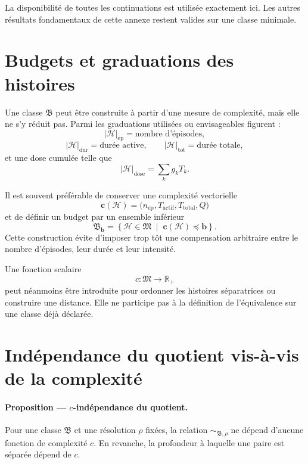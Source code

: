 La disponibilité de toutes les continuations est utilisée exactement
ici. Les autres résultats fondamentaux de cette annexe restent valides
sur une classe minimale.

\section{Budgets et graduations des histoires}
\label{annexe-histoires-budgets}

Une classe \(\mathfrak B\) peut être construite à partir d'une mesure de
complexité, mais elle ne s'y réduit pas. Parmi les graduations utilisées
ou envisageables figurent :
\[
|\mathcal H|_{\mathrm{ep}}
=
\text{nombre d'épisodes},
\]
\[
|\mathcal H|_{\mathrm{dur}}
=
\text{durée active},
\qquad
|\mathcal H|_{\mathrm{tot}}
=
\text{durée totale},
\]
et une dose cumulée telle que
\[
|\mathcal H|_{\mathrm{dose}}
=
\sum_k g_kT_k.
\]

Il est souvent préférable de conserver une complexité vectorielle
\begin{equation}
\label{eq:annexe-G-complexite-vectorielle}
\mathbf c(\mathcal H)
=
\bigl(
 n_{\mathrm{ep}},
 T_{\mathrm{actif}},
 T_{\mathrm{total}},
 Q
\bigr)
\end{equation}
et de définir un budget par un ensemble inférieur
\begin{equation}
\label{eq:annexe-G-budget-vectoriel}
\mathfrak B_{\mathbf b}
=
\left\{
\mathcal H\in\mathfrak M
\;\middle|\;
\mathbf c(\mathcal H)\preceq\mathbf b
\right\}.
\end{equation}
Cette construction évite d'imposer trop tôt une compensation arbitraire
entre le nombre d'épisodes, leur durée et leur intensité.

Une fonction scalaire
\[
c:\mathfrak M\longrightarrow\mathbb R_+
\]
peut néanmoins être introduite pour ordonner les histoires séparatrices
ou construire une distance. Elle ne participe pas à la définition de
l'équivalence sur une classe déjà déclarée.

\section{Indépendance du quotient vis-à-vis de la complexité}
\label{annexe-histoires-c-independance}

\paragraph{Proposition \theproposition{} --- \(c\)-indépendance du quotient.}
Pour une classe \(\mathfrak B\) et une résolution \(\rho\) fixées, la
relation \(\sim_{\mathfrak B,\rho}\) ne dépend d'aucune fonction de
complexité \(c\). En revanche, la profondeur à laquelle une paire est
séparée dépend de \(c\).

